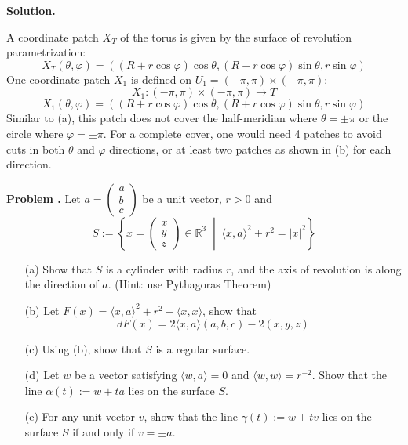 \documentclass[12pt, a4paper, oneside]{article}
\newcounter{problemname}
\newenvironment{problems}
  {\begin{shaded}\stepcounter{problemname}\par\noindent\textbf{Problem \arabic{problemname}. }\newline}
  {\end{shaded}\par}
\newenvironment{solution}
  {\par\noindent\textbf{Solution. }\newline}
  {\par}
\begin{document}
\begin{solution}
\begin{enumerate}
A coordinate patch $X_{T}$ of the torus is given by the surface of revolution parametrization:
$$
X_{T}(\theta, \varphi) = ((R+r\cos\varphi)\cos\theta, (R+r\cos\varphi)\sin\theta, r\sin\varphi)
$$
One coordinate patch $X_1$ is defined on $U_1 = (-\pi, \pi) \times (-\pi, \pi)$:
$$
X_1: (-\pi, \pi) \times (-\pi, \pi) \rightarrow T
$$
$$
X_1(\theta, \varphi) = ((R+r\cos\varphi)\cos\theta, (R+r\cos\varphi)\sin\theta, r\sin\varphi)
$$
Similar to (a), this patch does not cover the half-meridian where $\theta=\pm\pi$ or the circle where $\varphi=\pm\pi$. For a complete cover, one would need 4 patches to avoid cuts in both $\theta$ and $\varphi$ directions, or at least two patches as shown in (b) for each direction.
\end{enumerate}
\end{solution}

\begin{problems}
Let $a = \begin{pmatrix} a \\ b \\ c \end{pmatrix}$ be a unit vector, $r>0$ and
$$S:=\left\{x=\begin{pmatrix} x \\ y \\ z \end{pmatrix} \in \mathbb{R}^3 \;\middle|\; \langle x,a\rangle^{2}+r^{2}=|x|^{2}\right\}$$
\begin{enumerate}
    \item[(a)] Show that $S$ is a cylinder with radius $r$, and the axis of revolution is along the direction of $a$. (Hint: use Pythagoras Theorem)

    \item[(b)] Let $F(x)=\langle x,a\rangle^{2}+r^{2}-\langle x,x\rangle$, show that
    $$dF(x)=2\langle x,a\rangle(a,b,c)-2(x,y,z)$$

    \item[(c)] Using (b), show that $S$ is a regular surface.

    \item[(d)] Let $w$ be a vector satisfying $\langle w,a\rangle=0$ and $\langle w,w\rangle=r^{-2}$. Show that the line $\alpha(t):=w+ta$ lies on the surface $S$.

    \item[(e)] For any unit vector $v$, show that the line $\gamma(t):=w+tv$ lies on the surface $S$ if and only if $v=\pm a$.
\end{enumerate}
\end{problems}
\end{document}
